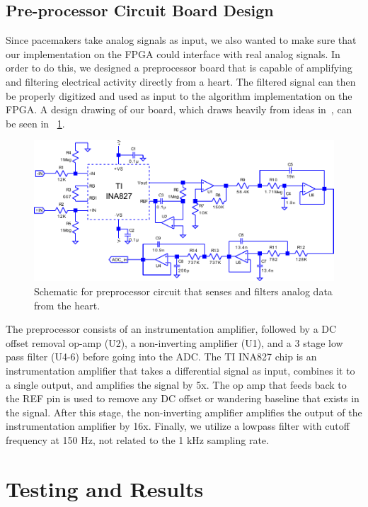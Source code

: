 \documentclass[conference]{IEEEtran}
\begin{document}
\subsection{Pre-processor Circuit Board Design}
Since pacemakers take analog signals as input,
we also wanted to make sure that our implementation on the
FPGA could interface with real analog signals.
In order to do this, we designed a preprocessor board that is
capable of amplifying and filtering electrical activity directly from a heart.
The filtered signal can then be properly 
digitized and used as input to the algorithm implementation
on the FPGA. A design drawing of our board, which
draws heavily from ideas in~\cite{analog-adcs}, 
can be seen in \figurename~\ref{fig:schematic}.

\begin{figure}[h]
	\centering
	\includegraphics[width=1.0\columnwidth]{schematic.pdf}
	\caption{Schematic for preprocessor circuit that senses and filters analog data from the heart.}
	\label{fig:schematic}
\end{figure}

The preprocessor consists of an instrumentation
amplifier, followed by a DC offset removal op-amp (U2), a
non-inverting amplifier (U1), and a 3 stage low pass filter (U4-6)
before going into the ADC.
The TI INA827 chip is an instrumentation
amplifier that takes a differential signal as input,
combines it to a single output, and amplifies the signal
by 5x. The op amp that feeds back to the REF pin is used to
remove any DC offset or wandering baseline that exists
in the signal. After this stage, the non-inverting amplifier
amplifies the output of the instrumentation amplifier by
16x. Finally, we utilize a lowpass filter with
cutoff frequency at 150 Hz, not related to the 1 kHz sampling rate.

\section{Testing and Results}
\end{document}
